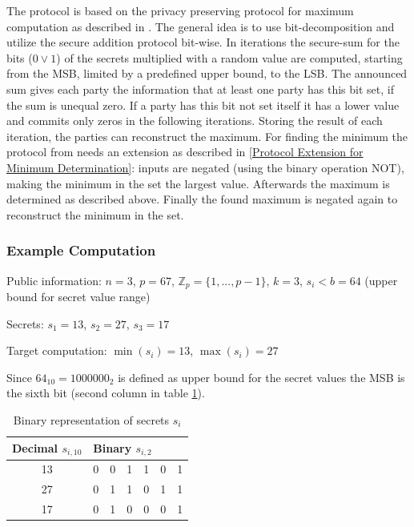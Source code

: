 The protocol is based on the privacy preserving protocol for maximum computation as described in \textcite{Hasan2013}. The general idea is to use bit-decomposition and utilize the secure addition protocol bit-wise. In iterations the secure-sum for the bits ($0 \lor 1$) of the secrets multiplied with a random value are computed, starting from the \gls{MSB}, limited by a predefined upper bound, to the \gls{LSB}. The announced sum gives each party the information that at least one party has this bit set, if the sum is unequal zero. If a party has this bit not set itself it has a lower value and commits only zeros in the following iterations. Storing the result of each iteration, the parties can reconstruct the maximum.
For finding the minimum the protocol from \textcite{Hasan2013} needs an extension as described in \ref{Protocol Extension for Minimum Determination}: inputs are negated (using the binary operation NOT), making the minimum in the set the largest value. Afterwards the maximum is determined as described above. Finally the found maximum is negated again to reconstruct the minimum in the set.

\subsubsection{Example Computation} \label{Secure Comparison Example}

Public information: $n=3$, $p=67$, $\mathbb{Z}_p=\{1,...,p-1\}$, $k=3$, $s_i<b=64$ (upper bound for secret value range) \par
\noindent Secrets: $s_1=13$, $s_2=27$, $s_3=17$ \par

\noindent Target computation: $\min(s_i)=13$, $\max(s_i)=27$

Since $64_{10}=1000000_2$ is defined as upper bound for the secret values the \gls{MSB} is the sixth bit (second column in table \ref{table:secure maximum binary representation of secrets}).

\begin{table}[!htb]
	\centering
	\caption{Binary representation of secrets $s_i$} \label{table:secure maximum binary representation of secrets}
	\begin{tabular}{|c|l|l|l|l|l|l|}
		\hline
		Decimal $s_{i,10}$ & \multicolumn{6}{l|}{Binary $s_{i,2}$} \\ \hline
		13                 & 0    & 0    & 1    & 1    & 0   & 1   \\ \hline
		27                 & 0    & 1    & 1    & 0    & 1   & 1   \\ \hline
		17                 & 0    & 1    & 0    & 0    & 0   & 1   \\ \hline
	\end{tabular}
\end{table}


